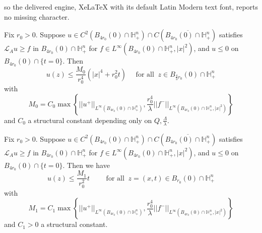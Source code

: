 \documentclass[10pt,a4paper]{amsart}
\def \H {{\mathbb H}}
\def \L {\mathcal{L}}
\begin{document}
so the delivered engine, XeLaTeX with its default Latin Modern text font, reports no missing character.
\begin{Lemma}\label{lemprimogiro}
Fix $r_0>0$. Suppose $u\in C^2(B_{4r_0}(0)\cap\H^n_+)\cap C(\overline{B_{4r_0}(0)\cap\H^n_+})$ satisfies $\L_A u \geq f$ in $B_{4r_0}(0)\cap\H^n_+$ for $f \in L^{\infty}(B_{4r_0}(0)\cap\H^n_+,|x|^2)$, and $u \leq 0$ on $B_{4r_0}(0) \cap \{t=0\}$. Then
$$u(z) \leq \frac{M_0}{r_0^4} \left(|x|^4+r_0^2 t \right) \quad \text{ for all } \ z \in B_{\frac{4}{3}r_0}(0)\cap \H^n_+$$
with
$$M_0=C_0\max\left\{ ||u^+||_{L^{\infty}(B_{4r_0}(0)\cap\H^n_+)}, 
\frac{r_0^4}{\lambda}||f^-||_{L^{\infty}(B_{4r_0}(0)\cap\H^n_+,|x|^2)}\right\}$$
and $C_0$ a structural constant depending only on $Q, \frac{\Lambda}{\lambda}$.
\end{Lemma}

\begin{Theorem}\label{primadinocond}
Fix $r_0>0$. Suppose $u\in C^2(B_{4r_0}(0)\cap\H^n_+)\cap C(\overline{B_{4r_0}(0)\cap\H^n_+})$ satisfies $\L_A u \geq f$ in $B_{4r_0}(0)\cap\H^n_+$ for $f \in L^{\infty}(B_{4r_0}(0)\cap\H^n_+,|x|^2)$, and $u\leq 0$ on $B_{4r_0}(0) \cap \{t=0\}$. Then we have
\begin{equation}\label{linear-growth-estimate}
u(z)\leq \frac{M_1}{r^2_0} t \qquad \text{ for all } \ z=(x,t) \in B_{r_0}(0)\cap \H^n_+
\end{equation}
with
$$M_1=C_1\max\left\{ ||u^+||_{L^{\infty}(B_{4r_0}(0)\cap\H^n_+)}, 
\frac{r_0^4}{\lambda}||f^-||_{L^{\infty}(B_{4r_0}(0)\cap\H^n_+,|x|^2)}\right\}$$
and $C_1>0$ a structural constant.
\end{Theorem}
\end{document}
